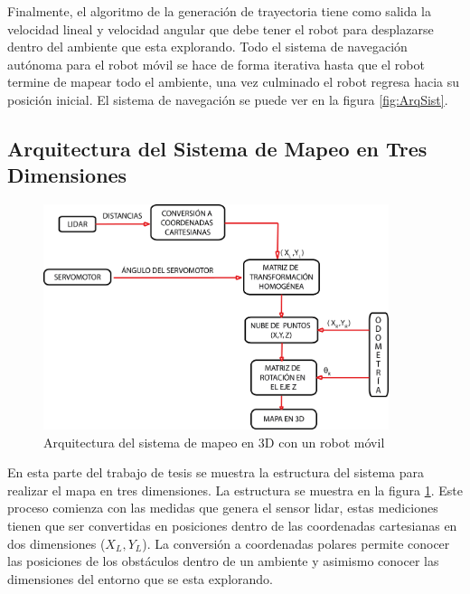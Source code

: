 Finalmente, el algoritmo de la generación de trayectoria tiene como salida la velocidad lineal y 
velocidad angular que debe tener el robot para desplazarse dentro del ambiente que esta explorando. Todo 
el sistema de navegación autónoma para el robot móvil se hace de forma iterativa hasta que el robot 
termine de mapear todo el ambiente, una vez culminado el robot regresa hacia su posición inicial. El 
sistema de navegación se puede ver en la figura \ref{fig:ArqSist}.


\subsection{Arquitectura del Sistema de Mapeo en Tres Dimensiones}

\begin{figure}%
	\centering \footnotesize
	\includegraphics[width=0.9\textwidth]{images/estructura_3d.png}
	\captionsetup{font=footnotesize}
	\caption{Arquitectura del sistema de mapeo en 3D con un robot móvil}
	\label{fig:Sist3D}
\end{figure}

En esta parte del trabajo de tesis se muestra la estructura del sistema para realizar el
mapa en tres dimensiones. La estructura se muestra en la figura \ref{fig:Sist3D}. Este 
proceso comienza con las medidas que genera el sensor lidar, estas mediciones tienen
que ser convertidas en posiciones dentro de las coordenadas cartesianas en dos dimensiones
($X_{L}, Y_{L}$). La conversión a coordenadas polares permite conocer las posiciones de los 
obstáculos dentro de un ambiente y asimismo conocer las dimensiones del entorno que se esta 
explorando.

